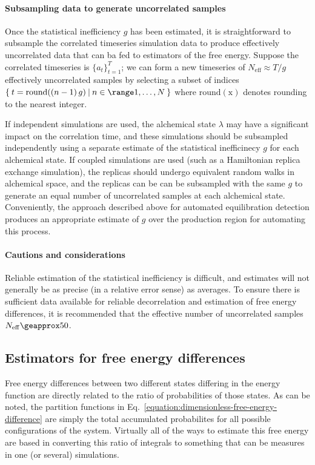 \documentclass[9pt,bestpractices]{livecoms}
\begin{document}
\paragraph{Subsampling data to generate uncorrelated samples}
Once the statistical inefficiency $g$ has been estimated, it is straightforward to subsample the correlated timeseries simulation data to produce effectively uncorrelated data that can ba fed to estimators of the free energy.
Suppose the correlated timeseries is $\{a_t\}_{t=1}^T$; we can form a new timeseries of $N_\mathrm{eff} \approx T / g$ effectively uncorrelated samples by selecting a subset of indices $\{ \: t = \mathrm{round}((n-1) \, g) \: | \: n \in \range 1,\ldots,N \: \}$ where $\mathrm{round(x)}$ denotes rounding to the nearest integer.

If independent simulations are used, the alchemical state $\lambda$ may have a significant impact on the correlation time, and these simulations should be subsampled independently using a separate estimate of the statistical inefficinecy $g$ for each alchemical state.
If coupled simulations are used (such as a Hamiltonian replica exchange simulation), the replicas should undergo equivalent random walks in alchemical space, and the replicas can be can be subsampled with the same $g$ to generate an equal number of uncorrelated samples at each alchemical state.
Conveniently, the approach described above for automated equilibration detection produces an appropriate estimate of $g$ over the production region for automating this process.

\paragraph{Cautions and considerations}
Reliable estimation of the statistical inefficiency is difficult, and estimates will not generally be as precise (in a relative error sense) as averages.
To ensure there is sufficient data available for reliable decorrelation and estimation of free energy differences, it is recommended that the effective number of uncorrelated samples $N_\mathrm{eff} \geapprox 50$.

\subsection*{Estimators for free energy differences}

Free energy differences between two different states differing in the energy function are directly related to the
ratio of probabilities of those states.
As can be noted, the partition functions in Eq.~\ref{equation:dimensionless-free-energy-difference} are simply the total accumulated probabilites for all possible configurations of the system. Virtually all of the ways to estimate this free energy are based in converting this ratio of integrals to something that can be measures in one (or several) simulations.  
\end{document}
